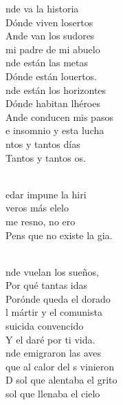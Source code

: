 \documentclass[12pt]{article}
\begin{document}
\begin{multicols*}{2}
\begin{cancion}%
	nde va la historia  \\
	Dónde viven losertos \\
	Ande van los sudores  \\
	mi padre de mi abuelo \\
	nde están las metas  \\
	Dónde están louertos. \\
	nde están los horizontes \\
	Dónde habitan lhéroes \\
	Ande conducen mis pasos  \\
	e insomnio y esta lucha \\
	ntos y tantos días \\
	Tantos y tantos os. \\\jump\\
	\begin{chorus}%
	edar impune la hiri\\
	 veros más elelo\\
	 me resno, no ero \\
	Pens que no existe la gia. \\
	\end{chorus}%
	\jump\\
	nde vuelan los sueños,  \\
	Por qué tantas idas \\
	Porónde queda el dorado \\
	l mártir y el comunista \\
	 suicida convencido \\
	Y el daré por ti vida.\\
	nde emigraron las aves \\
	que al calor del s vinieron \\
	D sol que alentaba el grito \\
	 sol que llenaba el cielo \\

\end{cancion}
\end{multicols*}
\end{document}

